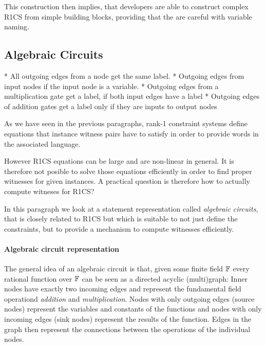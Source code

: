 This construction then implies, that developers are able to construct complex R1CS from simple building blocks, providing that the are careful with variable naming. 

\subsection{Algebraic Circuits} 
* All outgoing edges from a node get the same label.
* Outgoing edges from input nodes if the input node is a variable.
* Outgoing edges from a multiplication gate get a label, if both input edges have a label
* Outgoing edges of addition gates get a label only if they are inputs to output nodes 

As we have seen in the previous paragraphs, rank-1 constraint systems define equations that instance witness pairs have to satisfy in order to provide words in the associated language.

However R1CS equations can be large and are non-linear in general. It is therefore not posible to solve those equations efficiently in order to find proper witnesses for given instances. A practical question is therefore how to actually compute witneses for R1CS?

In this paragraph we look at a statement representation called \textit{algebraic circuits}, that is closely related to R1CS but which is suitable to not just define the constraints, but to provide a mechanism to compute witnesses efficiently.

\paragraph{Algebraic circuit representation}
The general idea of an algebraic circuit is that, given some finite field $\mathbb{F}$ every rational function over $\mathbb{F}$ can be seen as a directed acyclic (multi)graph: Inner nodes have exactly two incoming edges and represent the fundamental field operationd \textit{addition} and \textit{multiplication}. Nodes with only outgoing edges (source nodes) represent the variables and constants of the functions and nodes with only incoming edges (sink nodes) represent the results of the function. Edges in the graph then represent the connections between the operations of the individual nodes.

